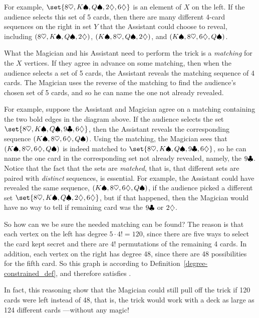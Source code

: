 For example, $\set{ 8 \hea, K \spa, Q \spa, 2 \dia, 6 \dia }$ is an
element of $X$ on the left.  If the audience selects this set of 5 cards,
then there are many different 4-card sequences on the right in set $Y$
that the Assistant could choose to reveal, including $(8 \heartsuit, K \spadesuit, Q
\spadesuit, 2 \diamondsuit)$, $(K \spadesuit, 8 \heartsuit, Q \spadesuit, 2 \diamondsuit)$, and $(K \spadesuit, 8 \heartsuit,
6 \diamondsuit, Q \spadesuit)$.

What the Magician and his Assistant need to perform the trick is a
\emph{matching} for the $X$ vertices.  If they agree in advance on some
matching, then when the audience selects a set of 5 cards, the Assistant
reveals the matching sequence of 4 cards.  The Magician uses the reverse
of the matching to find the audience's chosen set of 5 cards, and so he
can name the one not already revealed.

For example, suppose the Assistant and Magician agree on a matching
containing the two bold edges in the diagram above.  If the audience
selects the set $\set{8 \hea, K \spa, Q \spa, 9 \clu, 6 \dia}$, then the
Assistant reveals the corresponding sequence $(K \spadesuit, 8 \heartsuit, 6 \diamondsuit, Q
\spadesuit)$.  Using the matching, the Magician sees that $(K \spadesuit, 8 \heartsuit, 6
\diamondsuit, Q \spadesuit)$ is indeed matched to $\set{8 \hea, K \spa, Q \spa, 9 \clu,
6 \dia}$, so he can name the one card in the corresponding set not already
revealed, namely, the $9 \clubsuit$.  Notice that the fact that the sets are
\emph{matched}, that is, that different sets are paired with
\emph{distinct} sequences, is essential.  For example, the Assistant
could have revealed the same sequence, $(K \spadesuit, 8 \heartsuit, 6 \diamondsuit, Q \spadesuit)$,
if the audience picked a different set $\set{8 \hea, K \spa, Q \spa, 2
\dia, 6 \dia}$, but if that happened, then the Magician would have no way
to tell if remaining card was the $9 \clubsuit$ or $2 \diamondsuit$.

So how can we be sure the needed matching can be found?  The reason is
that each vertex on the left has degree $5 \cdot 4! = 120$, since there
are five ways to select the card kept secret and there are $4!$
permutations of the remaining 4 cards.  In addition, each vertex on the
right has degree 48, since there are 48 possibilities for the fifth card.
So this graph is \emph{} according to
Definition~\ref{degree-constrained_def}, and therefore satisfies .

In fact, this reasoning show that the Magician could still pull off the
trick if 120 cards were left instead of 48, that is, the trick would work
with a deck as large as 124 different cards ---without any magic!

